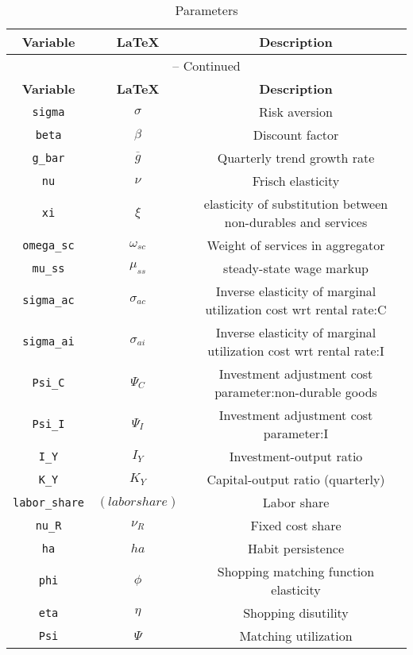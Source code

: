 \begin{center}
\begin{longtable}{ccc}
\caption{Parameters}\\%
\hline%
\multicolumn{1}{c}{\textbf{Variable}} &
\multicolumn{1}{c}{\textbf{\LaTeX}} &
\multicolumn{1}{c}{\textbf{Description}}\\%
\hline\hline%
\endfirsthead
\multicolumn{3}{c}{{\tablename} \thetable{} -- Continued}\\%
\hline%
\multicolumn{1}{c}{\textbf{Variable}} &
\multicolumn{1}{c}{\textbf{\LaTeX}} &
\multicolumn{1}{c}{\textbf{Description}}\\%
\hline\hline%
\endhead
\texttt{sigma} & ${\sigma}$ & Risk aversion\\
\texttt{beta} & ${\beta}$ & Discount factor\\
\texttt{g\_bar} & ${\overline{g}}$ & Quarterly trend growth rate\\
\texttt{nu} & $\nu$ & Frisch elasticity\\
\texttt{xi} & $\xi$ & elasticity of substitution between non-durables and services\\
\texttt{omega\_sc} & $\omega_{sc}$ & Weight of services in aggregator\\
\texttt{mu\_ss} & $\mu_{ss}$ & steady-state wage markup\\
\texttt{sigma\_ac} & ${\sigma_{ac}}$ & Inverse elasticity of marginal utilization cost wrt rental rate:C\\
\texttt{sigma\_ai} & ${\sigma_{ai}}$ & Inverse elasticity of marginal utilization cost wrt rental rate:I\\
\texttt{Psi\_C} & ${\Psi_{C}}$ & Investment adjustment cost parameter:non-durable goods\\
\texttt{Psi\_I} & ${\Psi_I}$ & Investment adjustment cost parameter:I\\
\texttt{I\_Y} & ${I_Y}$ & Investment-output ratio\\
\texttt{K\_Y} & ${K_Y}$ & Capital-output ratio (quarterly)\\
\texttt{labor\_share} & $(labor share)$ & Labor share\\
\texttt{nu\_R} & ${\nu_R}$ & Fixed cost share\\
\texttt{ha} & ${ha}$ & Habit persistence\\
\texttt{phi} & ${\phi}$ & Shopping matching function elasticity\\
\texttt{eta} & ${\eta}$ & Shopping disutility\\
\texttt{Psi} & ${\Psi}$ & Matching utilization\\

\end{longtable}
\end{center}

